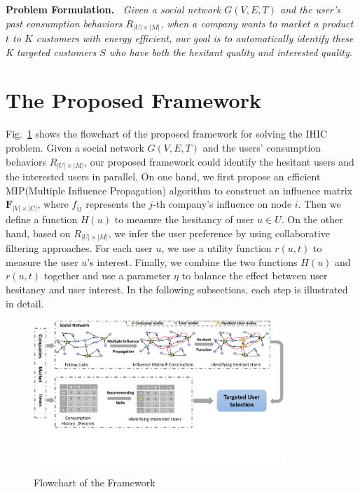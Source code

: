 \documentclass{llncs}
\begin{document}
\textbf{Problem Formulation.~}
\emph{Given a social network $G(V,E,T)$ and the user's past consumption behaviors $R_{|U| \times |M|}$, when a company wants to market a product $t$ to $K$ customers with energy efficient, our goal is %
to automatically identify these K targeted customers $S$ who have both the hesitant quality and interested quality.}


\vspace*{-0.4cm}
\section{The Proposed Framework}\label{sec:framework}
\vspace*{-0.4cm}
Fig.~\ref{fig:overview} shows the flowchart of the proposed framework for solving the IHIC problem. Given a social network $G(V,E,T)$ and the users' consumption behaviors $R_{|U| \times |M|}$, our proposed framework could identify the hesitant users and the interested users in parallel.
On one hand, we first propose an efficient MIP(Multiple Influence Propagation) algorithm to construct an influence matrix
$\mathbf{F}_{|V| \times |C|}$, where $f_{ij}$ represents the $j$-th company's influence on node $i$. Then we define a function $H(u)$ to measure the hesitancy of user $u \in U$. On the other hand, based on $R_{|U| \times |M|}$, we infer the user preference by using collaborative filtering approaches. For each user $u$, we use a utility function $r(u,t)$ to measure the user $u$'s interest. Finally, we combine the two functions $H(u)$ and $r(u,t)$ together and use a parameter $\eta$ to balance the effect between user hesitancy and user interest.
In the following subsections, each step is illustrated in detail. 

\begin{figure}[t]
  \centering
  \includegraphics[width=0.85\textwidth]{res/overview.pdf}\\
  \vspace*{-0.5cm}
  \caption{Flowchart of the Framework}\label{fig:overview}
  \vspace*{-0.1cm}
\end{figure}
\end{document}
